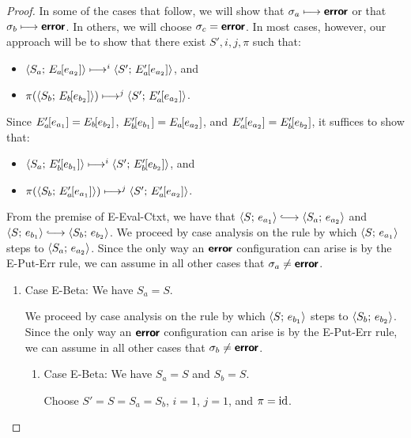 \begin{proof}
  In some of the cases that follow, we will show that $\sigma_a
  \longmapsto \textbf{\textsf{error}}$ or that $\sigma_b \longmapsto \textbf{\textsf{error}}$.  In
  others, we will choose $\sigma_c = \textbf{\textsf{error}}$.  In most cases, however,
  our approach will be to show that there exist $S', i, j, \pi$ such
  that:
  \begin{itemize}
  \item $\langle S_a;\, E_a\hspace{-1mm}\left[e_{a_2}\right] \rangle \longmapsto^i
    \langle S';\, E'_a\hspace{-1mm}\left[e_{a_2}\right] \rangle$, and
  \item $\pi(\langle S_b;\, E_b\hspace{-1mm}\left[e_{b_2}\right] \rangle) \longmapsto^j
    \langle S';\, E'_a\hspace{-1mm}\left[e_{a_2}\right] \rangle$.
  \end{itemize}
  Since $E'_a\hspace{-1mm}\left[e_{a_1}\right] = E_b\hspace{-1mm}\left[e_{b_2}\right]$,
  $E'_b\hspace{-1mm}\left[e_{b_1}\right] = E_a\hspace{-1mm}\left[e_{a_2}\right]$, and
  $E'_a\hspace{-1mm}\left[e_{a_2}\right] = E'_b\hspace{-1mm}\left[e_{b_2}\right]$, it suffices
  to show that:
  \begin{itemize}
  \item $\langle S_a;\, E'_b\hspace{-1mm}\left[e_{b_1}\right] \rangle \longmapsto^i
    \langle S';\, E'_b\hspace{-1mm}\left[e_{b_2}\right] \rangle$, and
  \item $\pi(\langle S_b;\, E'_a\hspace{-1mm}\left[e_{a_1}\right] \rangle) \longmapsto^j
    \langle S';\, E'_a\hspace{-1mm}\left[e_{a_2}\right] \rangle$.
  \end{itemize}
  From the premise of {\sc E-Eval-Ctxt}, we have that
  $\config{S}{e_{a_1}} \parstepsto \config{S_a}{e_{a_2}}$ and
  $\config{S}{e_{b_1}} \parstepsto \config{S_b}{e_{b_2}}$.  We proceed
  by case analysis on the rule by which $\langle S;\, e_{a_1} \rangle$ steps to
  $\langle S_a;\, e_{a_2} \rangle$.  Since the only way an $\textbf{\textsf{error}}$
  configuration can arise is by the {\sc E-Put-Err} rule, we can
  assume in all other cases that $\sigma_a \neq \textbf{\textsf{error}}$.

  \begin{enumerate}
  \item Case {\sc E-Beta}: We have $S_a = S$.

    We proceed by case analysis on the rule by which
    $\langle S;\, e_{b_1} \rangle$ steps to $\langle S_b;\, e_{b_2} \rangle$.  Since the
    only way an $\textbf{\textsf{error}}$ configuration can arise is by the {\sc
      E-Put-Err} rule, we can assume in all other cases that $\sigma_b
    \neq \textbf{\textsf{error}}$.
    \begin{enumerate}
    \item \label{slqc-beta-beta}Case {\sc E-Beta}: We have $S_a = S$
      and $S_b = S$.

      Choose $S' = S = S_a = S_b$, $i = 1$, $j = 1$, and $\pi = \mathrm{id}$.


\end{enumerate}
\end{enumerate}
\end{proof}
